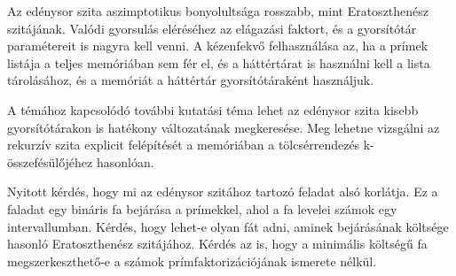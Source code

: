 \documentclass[12pt]{report}
\begin{document}
Az edénysor szita aszimptotikus bonyolultsága rosszabb,
mint Eratoszthenész szitájának.
Valódi gyorsulás eléréséhez az elágazási faktort,
és a gyorsítótár paramétereit is nagyra kell venni.
A kézenfekvő felhasználása az, ha a prímek listája a teljes memóriában sem fér el,
és a háttértárat is használni kell a lista tárolásához,
és a memóriát a háttértár gyorsítótáraként használjuk.

\bigskip

A témához kapcsolódó további kutatási téma lehet az edénysor szita
kisebb gyorsítótárakon is hatékony változatának megkeresése.
Meg lehetne vizsgálni az rekurzív szita explicit felépítését a memóriában
a tölcsérrendezés k-összefésülőjéhez hasonlóan.

Nyitott kérdés, hogy mi az edénysor szitához tartozó feladat alsó korlátja.
Ez a faladat egy bináris fa bejárása a prímekkel,
ahol a fa levelei számok egy intervallumban.
Kérdés, hogy lehet-e olyan fát adni, aminek bejárásának költsége hasonló
Eratoszthenész szitájához.
Kérdés az is, hogy a minimális költségű fa megszerkeszthető-e a
számok prímfaktorizációjának ismerete nélkül.
\end{document}
